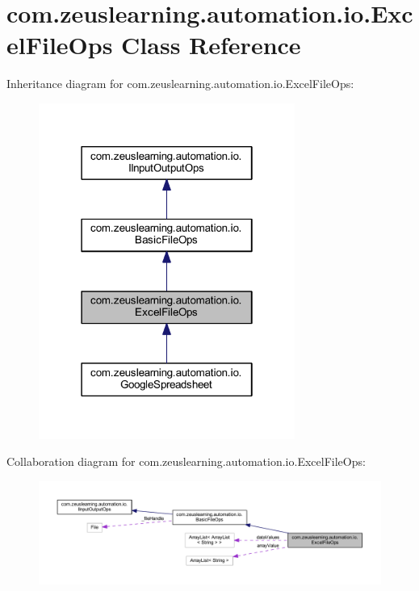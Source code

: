 \hypertarget{classcom_1_1zeuslearning_1_1automation_1_1io_1_1ExcelFileOps}{}\section{com.\+zeuslearning.\+automation.\+io.\+Excel\+File\+Ops Class Reference}
\label{classcom_1_1zeuslearning_1_1automation_1_1io_1_1ExcelFileOps}


Inheritance diagram for com.\+zeuslearning.\+automation.\+io.\+Excel\+File\+Ops\+:\nopagebreak
\begin{figure}[H]
\begin{center}
\leavevmode
\includegraphics[width=238pt]{da/dd3/classcom_1_1zeuslearning_1_1automation_1_1io_1_1ExcelFileOps__inherit__graph}
\end{center}
\end{figure}


Collaboration diagram for com.\+zeuslearning.\+automation.\+io.\+Excel\+File\+Ops\+:
\nopagebreak
\begin{figure}[H]
\begin{center}
\leavevmode
\includegraphics[width=350pt]{d7/de1/classcom_1_1zeuslearning_1_1automation_1_1io_1_1ExcelFileOps__coll__graph}
\end{center}
\end{figure}

